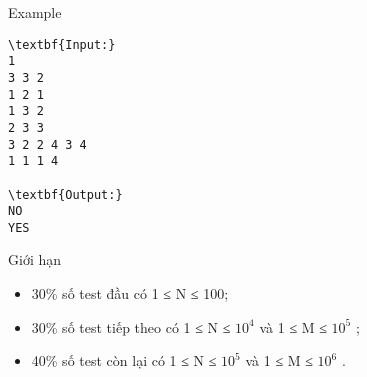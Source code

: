 Example
\begin{verbatim}
\textbf{Input:}
1
3 3 2
1 2 1
1 3 2
2 3 3
3 2 2 4 3 4
1 1 1 4

\textbf{Output:}
NO
YES\end{verbatim}
Giới hạn
\begin{itemize}
	\item 30\% số test đầu có 1 ≤ N ≤ 100;
	\item 30\% số test tiếp theo có 1 ≤ N ≤ $10^{4}$ và 1 ≤ M ≤ $10^{5}$ ;
	\item 40\% số test còn lại có 1 ≤ N ≤ $10^{5}$ và 1 ≤ M ≤ $10^{6}$ .
\end{itemize}